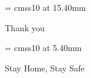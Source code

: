 \documentclass{bredelebeamer}
\begin{document}
\begin{frame}[plain]

      \begin{center}

        \font\endfont = cmss10 at 15.40mm
        \color{Brown}
        \endfont 
        \baselineskip 20.0mm

        Thank you

      \end{center} 
      \begin{center}

        \font\endfont = cmss10 at 5.40mm
        \color{Brown}
        \endfont 
        \baselineskip 20.0mm

        Stay Home, Stay Safe

      \end{center} 

\end{frame}
\end{document}
